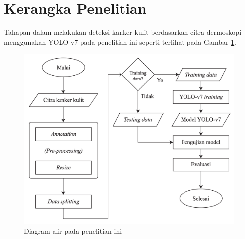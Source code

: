 \section{Kerangka Penelitian}
Tahapan dalam melakukan deteksi kanker kulit berdasarkan citra dermoskopi menggunakan YOLO-v7 pada penelitian ini seperti terlihat pada Gambar \ref{fig:flowchart}.

\begin{figure}[H]
    \begin{center}
        \includegraphics[width=13cm]{../img/Flowchart.png}
        \caption{Diagram alir pada penelitian ini}
        \label{fig:flowchart}
    \end{center}
\end{figure}

